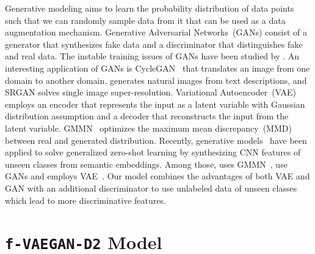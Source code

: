 \documentclass[10pt,twocolumn,letterpaper]{article}
\newcommand{\myparagraph}[1]{\vspace{5pt}\noindent{\bf #1}}
\begin{document}
\myparagraph{Generative Models.} Generative modeling aims to learn the probability distribution of data points such that we can randomly sample data from it that can be used as a data augmentation mechanism. Generative Adversarial Networks~(GANs)\cite{GPMXWDOCB14,conditionalgans,RMC16} consist of a generator that synthesizes fake data and a discriminator that distinguishes fake and real data. 
The instable training issues of GANs have been studied by \cite{gulrajani2017improved,arjovsky2017towards,miyato2018spectral}. An interesting application of GANs is CycleGAN~\cite{CycleGAN2017} that translates an image from one domain to another domain. \cite{RAYLSL16} generates natural images from text descriptions, and SRGAN\cite{ledig2017photo} solves single image super-resolution. Variational Autoencoder~(VAE)~\cite{kingma2013auto} employs an encoder that represents the input as a latent variable with Gaussian distribution assumption and a decoder that reconstructs the input from the latent variable. GMMN~\cite{li2015generative} optimizes the maximum mean discrepancy~(MMD)~\cite{gretton2007kernel} between real and generated distribution. Recently, generative models~\cite{BHJ17,Zhu_2018_CVPR, Verma_2018_CVPR,XLSA18} have been applied to solve generalized zero-shot learning by synthesizing CNN features of unseen classes from semantic embeddings. Among those, \cite{BHJ17} uses GMMN~\cite{li2015generative}, 
\cite{Zhu_2018_CVPR, XLSA18} use GANs\cite{GPMXWDOCB14} and \cite{Verma_2018_CVPR} employs VAE~\cite{kingma2013auto}. Our model combines the advantages of both VAE and GAN with an additional discriminator to use unlabeled data of unseen classes which lead to more discriminative features. 



\section{\texttt{f-VAEGAN-D2} Model}
\end{document}

